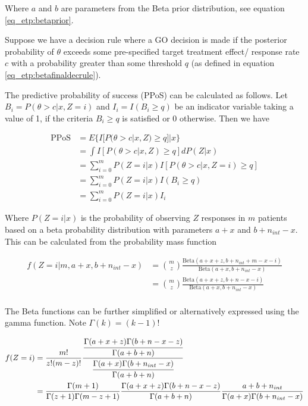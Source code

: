 Where $a$ and $b$ are parameters from the Beta prior distribution, see equation \ref{eq_etp:betaprior}. 

Suppose we have a decision rule where a GO decision is made if the posterior probability of $\theta$ exceeds some pre-specified target treatment effect/ response rate $c$ with a probability greater than some threshold $q$ (as defined in equation \ref{eq_etp:betafinaldecrule}).

The predictive probability of success (PPoS) can be calculated as follows. Let $B_i = P(\theta > c |x, Z=i)$ and $I_i = I(B_i \geq q)$ be an indicator variable taking a value of 1, if the criteria $B_i \geq q$ is satisfied or 0 otherwise. Then we have 

\begin{equation}
	\begin{aligned}
		\text{PPoS} & = E\{I[P(\theta > c |x,Z) \geq q]|x \} \\
		& = \int I[P(\theta > c |x,Z) \geq q]dP(Z|x) \\
		& = \sum_{i =0}^{m} P(Z = i|x)I[P(\theta > c |x,Z=i) \geq q] \\
		& = \sum_{i =0}^{m} P(Z=i|x)I(B_i \geq q) \\
		& = \sum_{i =0}^{m} P(Z=i|x)I_i
	\end{aligned}
\end{equation}

Where $P(Z = i | x)$ is the probability of observing $Z$ responses in $m$ patients based on a beta probability distribution with parameters $a+x$ and $b+n_{int}-x$. This can be calculated from the probability mass function

\begin{equation}
	\begin{aligned}
		f(Z = i|m, a+x, b+n_{int}-x) & = {m\choose z} \frac{\text{Beta}(a+x+z, b+n_{int}+m-x-i)}{\text{Beta}(a+x, b+n_{int}-x)} \\
		& = {m\choose z} \frac{\text{Beta}(a+x+z, b+n-x-i)}{\text{Beta}(a+x, b+n_{int}-x)} \\
	\end{aligned}
\end{equation}

The Beta functions can be further simplified or alternatively expressed using the gamma function. Note $\Gamma(k) = (k-1)!$

\small
\begin{equation}
	\begin{aligned}
		f(Z = i) & = \frac{m!}{z!(m-z)!}\cfrac{\cfrac{\Gamma(a+x+z)\Gamma(b+n-x-z)}{\Gamma(a+b+n)}}{\cfrac{\Gamma(a+x)\Gamma(b+n_{int}-x)}{\Gamma(a+b+n)}} \\
		& = \frac{\Gamma(m+1)}{\Gamma(z+1)\Gamma(m-z+1)}\frac{\Gamma(a+x+z)\Gamma(b+n-x-z)}{\Gamma(a+b+n)}\frac{a+b+n_{int}}{\Gamma(a+x)\Gamma(b+n_{int}-x)}
	\end{aligned}
\end{equation}
\normalsize

